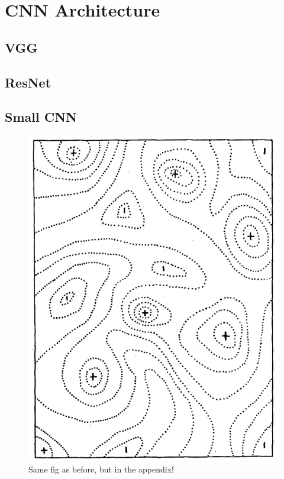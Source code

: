 \chapter{CNN Architecture} 
\label{arcgutecture} 

\section{VGG}
\section{ResNet}
\section{Small CNN}
\begin{figure}[h] %
	\centering
	\includegraphics[scale=0.4]{Figs/Wright_1932_1.pdf}
    \caption[Same Fig]{Same fig as before, but in the appendix!}
    \label{Another_fig}
\end{figure}
